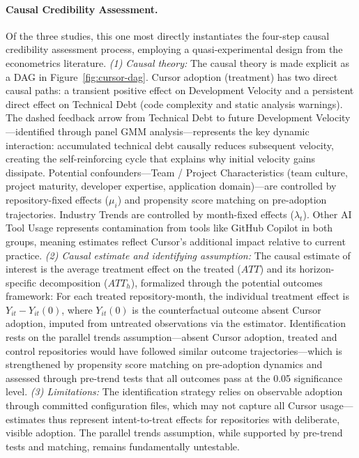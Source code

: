 \paragraph{Causal Credibility Assessment.}
Of the three studies, this one most directly instantiates the four-step causal credibility assessment process, employing a quasi-experimental design from the econometrics literature.
\emph{(1) Causal theory:} The causal theory is made explicit as a DAG in Figure~\ref{fig:cursor-dag}.
Cursor adoption (treatment) has two direct causal paths: a transient positive effect on Development Velocity and a persistent direct effect on Technical Debt (code complexity and static analysis warnings).
The dashed feedback arrow from Technical Debt to future Development Velocity---identified through panel GMM analysis---represents the key dynamic interaction: accumulated technical debt causally reduces subsequent velocity, creating the self-reinforcing cycle that explains why initial velocity gains dissipate.
Potential confounders---Team / Project Characteristics (team culture, project maturity, developer expertise, application domain)---are controlled by repository-fixed effects ($\mu_i$) and propensity score matching on pre-adoption trajectories.
Industry Trends are controlled by month-fixed effects ($\lambda_t$).
Other AI Tool Usage represents contamination from tools like GitHub Copilot in both groups, meaning estimates reflect Cursor's additional impact relative to current practice.
\emph{(2) Causal estimate and identifying assumption:} The causal estimate of interest is the average treatment effect on the treated ($ATT$) and its horizon-specific decomposition ($ATT_h$), formalized through the potential outcomes framework: For each treated repository-month, the individual treatment effect is $Y_{it} - Y_{it}(0)$, where $Y_{it}(0)$ is the counterfactual outcome absent Cursor adoption, imputed from untreated observations via the \citet{borusyak2024revisiting} estimator.
Identification rests on the parallel trends assumption---absent Cursor adoption, treated and control repositories would have followed similar outcome trajectories---which is strengthened by propensity score matching on pre-adoption dynamics and assessed through pre-trend tests that all outcomes pass at the 0.05 significance level.
\emph{(3) Limitations:} The identification strategy relies on observable adoption through committed configuration files, which may not capture all Cursor usage---estimates thus represent intent-to-treat effects for repositories with deliberate, visible adoption.
The parallel trends assumption, while supported by pre-trend tests and matching, remains fundamentally untestable.
